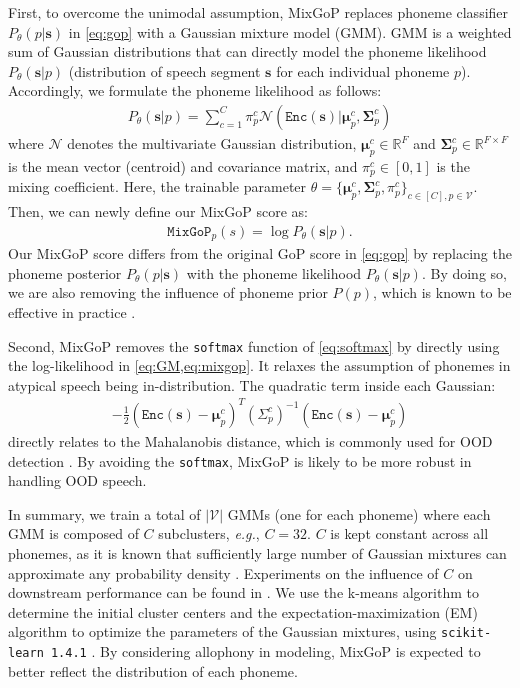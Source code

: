 First, to overcome the unimodal assumption, MixGoP replaces phoneme classifier $P_\theta(p | \mathbf{s})$ in \cref{eq:gop} with a Gaussian mixture model (GMM).
GMM is a weighted sum of Gaussian distributions that can directly model the phoneme likelihood $P_\theta (\mathbf{s} | p)$ (distribution of speech segment $\mathbf{s}$ for each individual phoneme $p$).
Accordingly, we formulate the phoneme likelihood as follows:
\begin{align}
    P_\theta (\mathbf{s} | p) = \sum_{c=1}^C \pi^c_{p} \mathcal{N}(\texttt{Enc}(\mathbf{s}) | \pmb{\mu}^{c}_{p}, \mathbf{\Sigma}^{c}_{p} ) \label{eq:GM}
\end{align}
where $\mathcal{N}$ denotes the multivariate Gaussian distribution, $\pmb{\mu}^{c}_{p} \in \mathbb{R}^F$ and $\mathbf{\Sigma}^{c}_{p} \in \mathbb{R}^{F \times F}$ is the mean vector (centroid) and covariance matrix, and $\pi^{c}_{p} \in [0, 1]$ is the mixing coefficient.
Here, the trainable parameter $\theta = \{\pmb{\mu}_p^c, \mathbf{\Sigma}_p^c, \pi_p^c\}_{c\in[C], p\in \mathcal{V}}$.
Then, we can newly define our MixGoP score as:
\begin{align}
    \texttt{MixGoP}_p(s) = \log P_\theta (\mathbf{s} | p).\label{eq:mixgop}
\end{align}
Our MixGoP score differs from the original GoP score in \cref{eq:gop} by replacing the phoneme posterior $P_\theta (p|\mathbf{s})$ with the phoneme likelihood $P_\theta (\mathbf{s} | p)$.
By doing so, we are also removing the influence of phoneme prior $P(p)$, which is known to be effective in practice \citep{yeo23_interspeech}.


Second, MixGoP removes the \texttt{softmax} function of \cref{eq:softmax} by directly using the log-likelihood in \cref{eq:GM,eq:mixgop}.
It relaxes the assumption of phonemes in atypical speech being in-distribution.
The quadratic term inside each Gaussian:
\begin{align}
    -\frac{1}{2} (\texttt{Enc}(\mathbf{s}) - \pmb{\mu}^{c}_{p})^T ({\Sigma^{c}_{p}})^{-1} (\texttt{Enc}(\mathbf{s}) - \pmb{\mu}^{c}_{p}) \label{eq:mahala}
\end{align}
directly relates to the Mahalanobis distance, which is commonly used for OOD detection \citep{lee2018simple}. 
By avoiding the \texttt{softmax}, MixGoP is likely to be more robust in handling OOD speech. 


In summary, we train a total of $|\mathcal{V}|$ GMMs (one for each phoneme) where each GMM is composed of $C$ subclusters, \textit{e.g.}, $C=32$.
$C$ is kept constant across all phonemes, as it is known that sufficiently large number of Gaussian mixtures can approximate any probability density \citep{nguyen2020approx}. 
Experiments on the influence of $C$ on downstream performance can be found in .
We use the k-means algorithm to determine the initial cluster centers and the expectation-maximization (EM) algorithm to optimize the parameters of the Gaussian mixtures, using \texttt{scikit-learn 1.4.1} \citep{scikit-learn}.
By considering allophony in modeling, MixGoP is expected to better reflect the distribution of each phoneme.



